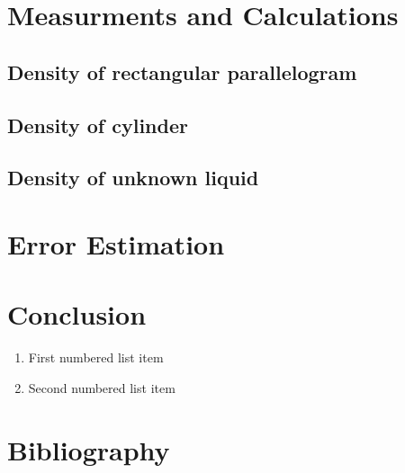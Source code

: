 \documentclass[a4paper, 12pt]{article}
\begin{document}
\section{Measurments and Calculations}



\subsection{Density of rectangular parallelogram}

\subsection{Density of cylinder}

\subsection{Density of unknown liquid}


\section{Error Estimation}



\section{Conclusion}



\begin{enumerate}
	\item First numbered list item
	\item Second numbered list item
\end{enumerate}


\section{Bibliography}



\end{document}
